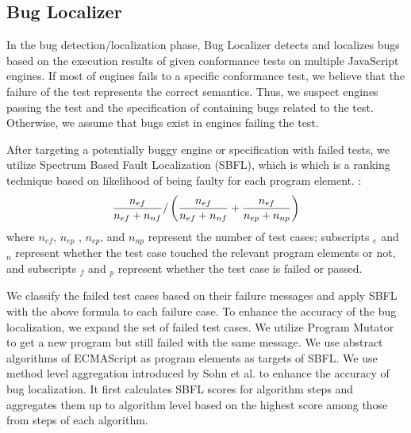 \subsection{Bug Localizer}

In the bug detection/localization phase, \textsf{Bug Localizer} detects and
localizes bugs based on the execution results of given conformance tests on
multiple JavaScript engines.  If most of engines fails to a specific
conformance test, we believe that the failure of the test represents the
correct semantics.  Thus, we suspect engines passing the test and the
specification of containing bugs related to the test.  Otherwise, we assume
that bugs exist in engines failing the test.

After targeting a potentially buggy engine or specification with failed tests,
we utilize Spectrum Based Fault Localization (SBFL)\cite{sbfl-survey}, which is
which is a ranking technique based on likelihood of being faulty for each
program element.  :
\[
  {{n_{ef}}\over{n_{ef} + n_{nf}}} /
  \left(
    {{n_{ef}}\over{n_{ef} + n_{nf}}} +
    {{n_{ef}}\over{n_{ep} + n_{np}}}
  \right)
\]
where $n_{ef}$, $n_{ep}$ , $n_{ep}$, and $n_{np}$ represent the number of test
cases; subscripts ${}_e$ and ${}_n$ represent whether the test case touched the
relevant program elements or not, and subscripts ${}_f$ and ${}_p$ represent
whether the test case is failed or passed.

We classify the failed test cases based on their failure messages and apply SBFL
with the above formula to each failure case.  To enhance the accuracy of the bug
localization, we expand the set of failed test cases.  We utilize
\textsf{Program Mutator} to get a new program but still failed with the same
message.  We use abstract algorithms of ECMAScript as program elements as
targets of SBFL.  We use method level aggregation introduced by Sohn et
al.\cite{fluccs} to enhance the accuracy of bug localization.  It first
calculates SBFL scores for algorithm steps and aggregates them up to algorithm
level based on the highest score among those from steps of each algorithm.
